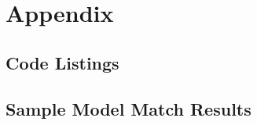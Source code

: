 \documentclass[draft,final]{thesisclass} %
\newcommand{\json}[2]{
    
}
\begin{document}
\backmatter


\nocite{*}
\printbibliography

\printindex

\printglossaries


\chapter{Appendix}
\setcounter{page}{1}
\setcounter{chapter}{0}

\section{Code Listings}


\section{Sample Model Match Results}
\json{match_result_candidate_1}{Match Result for \textit{Bao Neilan}}
\json{match_result_candidate_8}{Match Result for \textit{Emanuelle Fought}}
\end{document}
